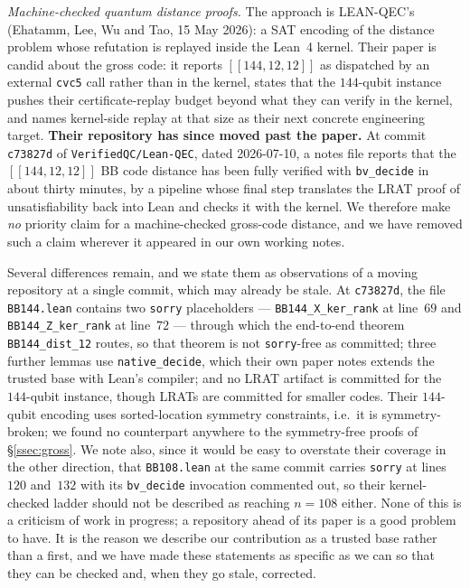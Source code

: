 \documentclass[11pt]{amsart}
\newcommand{\gross}{[[144,12,12]]}
\theoremstyle{plain}
\theoremstyle{definition}
\theoremstyle{remark}
\begin{document}
\emph{Machine-checked quantum distance proofs.} The approach is LEAN-QEC's
\cite{LeanQEC} (Ehatamm, Lee, Wu and Tao, 15 May 2026): a SAT encoding of the
distance problem whose refutation is replayed inside the Lean~4 kernel. Their
paper is candid about the gross code: it reports $\gross$ as dispatched by an
external \texttt{cvc5} call rather than in the kernel, states that the
$144$-qubit instance pushes their certificate-replay budget beyond what they
can verify in the kernel, and names kernel-side replay at that size as their
next concrete engineering target. \textbf{Their repository has since moved past
the paper.} At commit \texttt{c73827d} of \texttt{VerifiedQC/Lean-QEC}, dated
2026-07-10, a notes file reports that the $\gross$ BB code distance has been
fully verified with \texttt{bv\_decide} in about thirty minutes, by a pipeline
whose final step translates the LRAT proof of unsatisfiability back into Lean
and checks it with the kernel. We therefore make \emph{no} priority claim for a
machine-checked gross-code distance, and we have removed such a claim wherever
it appeared in our own working notes.

Several differences remain, and we state them as observations of a moving
repository at a single commit, which may already be stale. At
\texttt{c73827d}, the file \texttt{BB144.lean} contains two \texttt{sorry}
placeholders --- \texttt{BB144\_X\_ker\_rank} at line~$69$ and
\texttt{BB144\_Z\_ker\_rank} at line~$72$ --- through which the end-to-end
theorem \texttt{BB144\_dist\_12} routes, so that theorem is not
\texttt{sorry}-free as committed; three further lemmas use
\texttt{native\_decide}, which their own paper notes extends the trusted base
with Lean's compiler; and no LRAT artifact is committed for the $144$-qubit
instance, though LRATs are committed for smaller codes. Their $144$-qubit
encoding uses sorted-location symmetry constraints, i.e.\ it is
symmetry-broken; we found no counterpart anywhere to the symmetry-free proofs
of \S\ref{ssec:gross}. We note also, since it would be easy to overstate their
coverage in the other direction, that \texttt{BB108.lean} at the same commit
carries \texttt{sorry} at lines~$120$ and~$132$ with its
\texttt{bv\_decide} invocation commented out, so their kernel-checked ladder
should not be described as reaching $n=108$ either. None of this is a
criticism of work in progress; a repository ahead of its paper is a good
problem to have. It is the reason we describe our contribution as a trusted
base rather than a first, and we have made these statements as specific as we
can so that they can be checked and, when they go stale, corrected.
\end{document}
